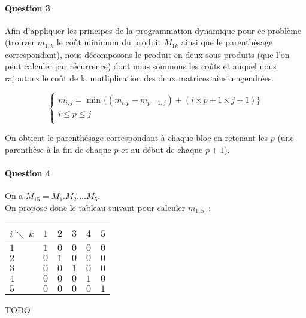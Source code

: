 \paragraph{Question 3}

Afin d'appliquer les principes de la programmation dynamique pour ce
problème (trouver $m_{1,k}$ le coût minimum du produit $M_{1k}$ ainsi
que le parenthésage correspondant), nous décomposons le produit en
deux sous-produits (que l'on peut calculer par récurrence) dont nous
sommons les coûts et auquel nous rajoutons le coût de la
mutliplication des deux matrices ainsi engendrées.

\begin{equation}
\begin{cases}
m_{i,j} = \min \{(m_{i,p}+m_{p+1,j}) + (i \times p+1 \times j+1) \} \\
i \leq p \leq j \\
\end{cases}
\end{equation}

On obtient le parenthésage correspondant à chaque bloc en retenant les
$p$ (une parenthèse à la fin de chaque $p$ et au début de chaque $p+1$).

\paragraph{Question 4}

On a $M_{15} = M_1.M_2.\dots M_5$. \\

On propose donc le tableau suivant pour calculer $m_{1,5}$~:
\begin{center}
\begin{tabular}{|l|c|c|c|c|c|}
\hline  $i$ $\diagdown$ $k$ & $1$  & $2$ & $3$ & $4$ & $5$ \\
\hline $1$ & $1$ & $0$ & $0$ & $0$ & $0$ \\
\hline $2$ & $0$ & $1$ & $0$ & $0$ & $0$ \\
\hline $3$ & $0$ & $0$ & $1$ & $0$ & $0$ \\
\hline $4$ & $0$ & $0$ & $0$ & $1$ & $0$ \\
\hline $5$ & $0$ & $0$ & $0$ & $0$ & $1$ \\
\hline
\end{tabular}
\end{center}

TODO

